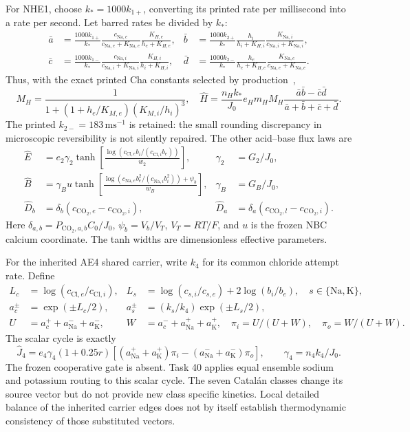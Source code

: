 For NHE1, choose $k_*=1000k_{1+}$, converting its printed rate per
millisecond into a rate per second.  Let barred rates be divided by $k_*$:
\begin{align*}
 \bar a&=\frac{1000k_{1+}}{k_*}
       \frac{c_{\mathrm{Na},e}}{c_{\mathrm{Na},e}+K_{\mathrm{Na},e}}
       \frac{K_{H,e}}{h_e+K_{H,e}},&
 \bar b&=\frac{1000k_{2+}}{k_*}
       \frac{h_i}{h_i+K_{H,i}}
       \frac{K_{\mathrm{Na},i}}{c_{\mathrm{Na},i}+K_{\mathrm{Na},i}},\\
 \bar c&=\frac{1000k_{1-}}{k_*}
       \frac{c_{\mathrm{Na},i}}{c_{\mathrm{Na},i}+K_{\mathrm{Na},i}}
       \frac{K_{H,i}}{h_i+K_{H,i}},&
 \bar d&=\frac{1000k_{2-}}{k_*}
       \frac{h_e}{h_e+K_{H,e}}
       \frac{K_{\mathrm{Na},e}}{c_{\mathrm{Na},e}+K_{\mathrm{Na},e}}.
\end{align*}
Thus, with the exact printed Cha constants selected by production~\cite{m44Cha2009},
\[
 M_H=\frac{1}{1+(1+h_e/K_{M,e})(K_{M,i}/h_i)^3},\quad
 \widehat H=\frac{n_Hk_*}{J_0}e_Hm_HM_H
        \frac{\bar a\bar b-\bar c\bar d}{\bar a+\bar b+\bar c+\bar d}.
\]
The printed $k_{2-}=183\,\mathrm{ms}^{-1}$ is retained: the small
rounding discrepancy in microscopic reversibility is not silently repaired.
The other acid--base flux laws are
\begin{align*}
 \widehat E&=e_2\gamma_2\tanh\left[
  \frac{\log(c_{\mathrm{Cl},e}b_i/(c_{\mathrm{Cl},i}b_e))}{w_2}\right],
 &\gamma_2&=G_2/J_0,\\
 \widehat B&=\gamma_Bu\tanh\left[
  \frac{\log(c_{\mathrm{Na},e}b_e^2/(c_{\mathrm{Na},i}b_i^2))+\psi_b}{w_B}\right],
 &\gamma_B&=G_B/J_0,\\
 \widehat D_b&=\delta_b(c_{\mathrm{CO}_2,e}-c_{\mathrm{CO}_2,i}),
 &\widehat D_a&=\delta_a(c_{\mathrm{CO}_2,l}-c_{\mathrm{CO}_2,i}).
\end{align*}
Here $\delta_{a,b}=P_{\mathrm{CO}_2,a,b}C_0/J_0$,
$\psi_b=V_b/V_T$, $V_T=RT/F$, and $u$ is the frozen NBC calcium
coordinate.  The tanh widths are dimensionless effective parameters.

For the inherited AE4 shared carrier, write $k_4$ for its common chloride
attempt rate.  Define
\begin{align*}
 L_c&=\log(c_{\mathrm{Cl},e}/c_{\mathrm{Cl},i}),&
 L_s&=\log(c_{s,i}/c_{s,e})+2\log(b_i/b_e),\quad s\in\{\mathrm{Na},\mathrm K\},\\
 a_c^\pm&=\exp(\pm L_c/2),&
 a_s^\pm&=(k_s/k_4)\exp(\pm L_s/2),\\
 U&=a_c^++a_{\mathrm{Na}}^-+a_{\mathrm K}^-,&
 W&=a_c^-+a_{\mathrm{Na}}^++a_{\mathrm K}^+,\quad
 \pi_i=U/(U+W),\quad\pi_o=W/(U+W).
\end{align*}
The scalar cycle is exactly
\[
 \widehat J_4=e_4\gamma_4(1+0.25r)
 \left[(a_{\mathrm{Na}}^++a_{\mathrm K}^+)\pi_i
       -(a_{\mathrm{Na}}^-+a_{\mathrm K}^-)\pi_o\right],
 \qquad\gamma_4=n_4k_4/J_0.
\]
The frozen cooperative gate is absent.  Task 40 applies equal ensemble
sodium and potassium routing to this scalar cycle.  The seven Catal\'an
classes change its source vector but do not provide new class specific
kinetics.  Local detailed balance of the inherited carrier edges does not
by itself establish thermodynamic consistency of those substituted vectors.

